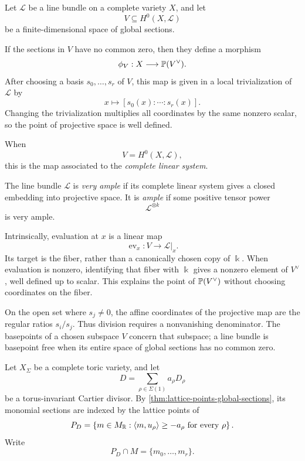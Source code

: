\begin{agcheatsheet}
Let \(\mathcal L\) be a line bundle on a complete variety \(X\), and
let
\[
V\subseteq H^0(X,\mathcal L)
\]
be a finite-dimensional space of global sections.

If the sections in \(V\) have no common zero, then they define a
morphism
\[
\phi_V:X\longrightarrow \mathbb{P}(V^\vee).
\]
After choosing a basis \(s_0,\dots,s_r\) of \(V\), this map is given
in a local trivialization of \(\mathcal L\) by
\[
x\longmapsto [s_0(x):\cdots:s_r(x)].
\]
Changing the trivialization multiplies all coordinates by the same
nonzero scalar, so the point of projective space is well defined.

When
\[
V=H^0(X,\mathcal L),
\]
this is the map associated to the \emph{complete linear system}.

The line bundle \(\mathcal L\) is \emph{very ample} if its complete
linear system gives a closed embedding into projective space. It is
\emph{ample} if some positive tensor power
\[
\mathcal L^{\otimes k}
\]
is very ample.
\end{agcheatsheet}

\begin{observation}
\label{obs:classroom-evaluation-ratios}
Intrinsically, evaluation at \(x\) is a linear map
\[
\operatorname{ev}_x:V\longrightarrow\mathcal L|_x.
\]
Its target is the fiber, rather than a canonically chosen copy of
\(\Bbbk\). When evaluation is nonzero, identifying that fiber with
\(\Bbbk\) gives a nonzero element of \(V^\vee\), well defined up to
scalar. This explains the point of \(\mathbb{P}(V^\vee)\) without choosing
coordinates on the fiber.

On the open set where \(s_j\ne0\), the affine coordinates of the
projective map are the regular ratios \(s_i/s_j\). Thus division
requires a nonvanishing denominator. The basepoints of a chosen
subspace \(V\) concern that subspace; a line bundle is basepoint free
when its entire space of global sections has no common zero.
\end{observation}

Let \(X_\Sigma\) be a complete toric variety, and let
\[
D=\sum_{\rho\in\Sigma(1)} a_\rho D_\rho
\]
be a torus-invariant Cartier divisor. By \cref{thm:lattice-points-global-sections},
its monomial sections are indexed by the lattice points of
\[
P_D=
\left\{
 m\in M_{\mathbb{R}}:
 \langle m,u_\rho\rangle\geq -a_\rho
 \text{ for every }\rho
\right\}.
\]
Write
\[
P_D\cap M=\{m_0,\dots,m_r\}.
\]

